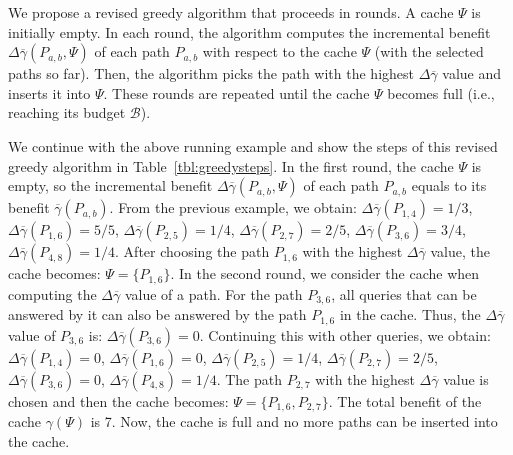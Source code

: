 \documentclass{sig-alternate}
\begin{document}

We propose a revised greedy algorithm that proceeds in rounds.
A cache $\Psi$ is initially empty.
In each round, the algorithm computes the incremental benefit
$\Delta\overline{\gamma}(P_{a,b}, \Psi)$ of each path $P_{a,b}$ with respect to the
cache $\Psi$ (with the selected paths so far).
Then, the algorithm picks the path with the highest $\Delta\overline{\gamma}$ value
and inserts it into $\Psi$. These rounds are repeated until the cache $\Psi$ becomes full
(i.e., reaching its budget $\mathcal{B}$).


We continue with the above running example and show the steps of
this revised greedy algorithm in Table~\ref{tbl:greedysteps}.
In the first round, the cache $\Psi$ is empty,
so the incremental benefit $\Delta\overline{\gamma}(P_{a,b}, \Psi)$ of each path $P_{a,b}$
equals to its benefit $\overline{\gamma}(P_{a,b})$.
From the previous example, we obtain:
$\Delta\overline{\gamma}(P_{1,4})=1/3$, $\Delta\overline{\gamma}(P_{1,6})=5/5$, $\Delta\overline{\gamma}(P_{2,5})=1/4$,
$\Delta\overline{\gamma}(P_{2,7})=2/5$, $\Delta\overline{\gamma}(P_{3,6})=3/4$, $\Delta\overline{\gamma}(P_{4,8})=1/4$.
After choosing the path $P_{1,6}$ with the highest $\Delta\overline{\gamma}$ value,
the cache becomes: $\Psi=\{P_{1,6}\}$.
In the second round, we consider the cache when computing the $\Delta\overline{\gamma}$ value of a path.
For the path $P_{3,6}$,
all queries that can be answered by it can also be answered by the path $P_{1,6}$ in the cache.
Thus, the $\Delta\overline{\gamma}$ value of $P_{3,6}$ is: $\Delta\overline{\gamma}(P_{3,6})=0$.
Continuing this with other queries, we obtain:
$\Delta\overline{\gamma}(P_{1,4})=0$, $\Delta\overline{\gamma}(P_{1,6})=0$, $\Delta\overline{\gamma}(P_{2,5})=1/4$,
$\Delta\overline{\gamma}(P_{2,7})=2/5$, $\Delta\overline{\gamma}(P_{3,6})=0$, $\Delta\overline{\gamma}(P_{4,8})=1/4$.
The path $P_{2,7}$ with the highest $\Delta\overline{\gamma}$ value is chosen
and then the cache becomes: $\Psi=\{P_{1,6},P_{2,7}\}$.
The total benefit of the cache $\gamma(\Psi)$ is 7.
Now, the cache is full and no more paths can be inserted into the cache.

\end{document}
